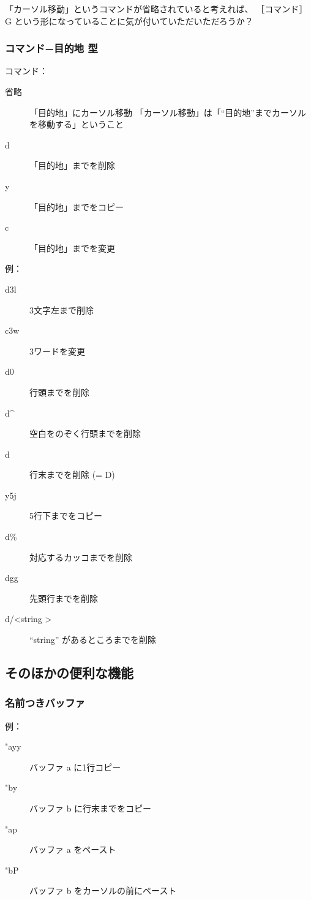 \documentclass[mingoth,a4paper]{jsarticle}
\begin{document}
「カーソル移動」というコマンドが省略されていると考えれば、
［コマンド］G という形になっていることに気が付いていただいただろうか？


\subsubsection{コマンド−目的地 型}


コマンド：
\begin{description}
  \item[省略] 「目的地」にカーソル移動
    「カーソル移動」は「``目的地''までカーソルを移動する」ということ
  \item[d] 「目的地」までを削除
  \item[y] 「目的地」までをコピー
  \item[c] 「目的地」までを変更
\end{description}

例：
\begin{description}
\item[d3l] 3文字左まで削除
\item[c3w] 3ワードを変更

\item[d0] 行頭までを削除
\item[d\textasciicircum] 空白をのぞく行頭までを削除
\item[d\textdollar] 行末までを削除 (= D)

\item[y5j] 5行下までをコピー
\item[d\%] 対応するカッコまでを削除
\item[dgg] 先頭行までを削除

\item[d/\textless string \textgreater] ``string'' があるところまでを削除
\end{description}

\subsection{そのほかの便利な機能}

\subsubsection{名前つきバッファ}

例：
\begin{description}
\item["ayy] バッファ a に1行コピー
\item["by\textdollar] バッファ b に行末までをコピー

\item["ap] バッファ a をペースト
\item["bP] バッファ b をカーソルの前にペースト
\end{description}
\end{document}

